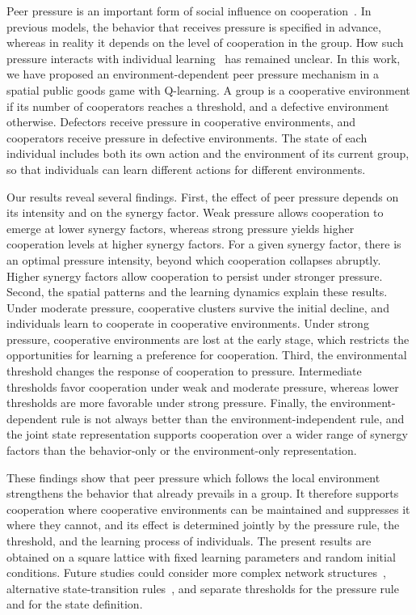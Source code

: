 \documentclass[%
  aip,cha,
  amsmath,amssymb,
  reprint,
  floatfix,
  article-title,
]{revtex4-2}
\begin{document}
Peer pressure is an important form of social influence on cooperation~\cite{yang2015peer,deng2018peer,gao2023impact,ma2025evolution}. In previous models, the behavior that receives pressure is specified in advance, whereas in reality it depends on the level of cooperation in the group. How such pressure interacts with individual learning~\cite{xie2026reinforcement,zheng2026brief} has remained unclear. In this work, we have proposed an environment-dependent peer pressure mechanism in a spatial public goods game with Q-learning. A group is a cooperative environment if its number of cooperators reaches a threshold, and a defective environment otherwise. Defectors receive pressure in cooperative environments, and cooperators receive pressure in defective environments. The state of each individual includes both its own action and the environment of its current group, so that individuals can learn different actions for different environments.

Our results reveal several findings. First, the effect of peer pressure depends on its intensity and on the synergy factor. Weak pressure allows cooperation to emerge at lower synergy factors, whereas strong pressure yields higher cooperation levels at higher synergy factors. For a given synergy factor, there is an optimal pressure intensity, beyond which cooperation collapses abruptly. Higher synergy factors allow cooperation to persist under stronger pressure. Second, the spatial patterns and the learning dynamics explain these results. Under moderate pressure, cooperative clusters survive the initial decline, and individuals learn to cooperate in cooperative environments. Under strong pressure, cooperative environments are lost at the early stage, which restricts the opportunities for learning a preference for cooperation. Third, the environmental threshold changes the response of cooperation to pressure. Intermediate thresholds favor cooperation under weak and moderate pressure, whereas lower thresholds are more favorable under strong pressure. Finally, the environment-dependent rule is not always better than the environment-independent rule, and the joint state representation supports cooperation over a wider range of synergy factors than the behavior-only or the environment-only representation.

These findings show that peer pressure which follows the local environment strengthens the behavior that already prevails in a group. It therefore supports cooperation where cooperative environments can be maintained and suppresses it where they cannot, and its effect is determined jointly by the pressure rule, the threshold, and the learning process of individuals. The present results are obtained on a square lattice with fixed learning parameters and random initial conditions. Future studies could consider more complex network structures~\cite{shi2024model,zhu2025multilayer}, alternative state-transition rules~\cite{guo2022effect}, and separate thresholds for the pressure rule and for the state definition.
\end{document}
